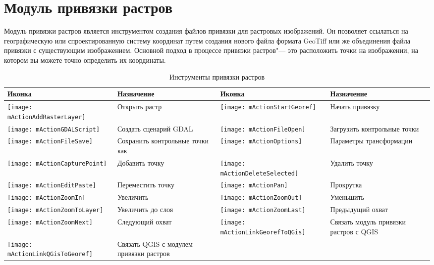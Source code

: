 
\section{Модуль привязки растров}


Модуль привязки растров является инструментом создания файлов привязки
для растровых изображений. Он позволяет ссылаться на географическую или
спроектированную систему координат путем создания нового файла формата
GeoTiff или же объединения файла привязки с существующим изображением.
Основной подход в процессе привязки растров"--- это расположить точки на
изображении, на котором вы можете точно определить их координаты.


\begin{table}[h]
\begin{tabular}{|m{1cm}|m{6cm}|m{1cm}|m{6cm}|}
 \hline \textbf{Иконка} & \textbf{Назначение} & \textbf{Иконка} &
 \textbf{Назначение} \\
 \hline \texttt{[image: mActionAddRasterLayer]} & Открыть растр &
 \texttt{[image: mActionStartGeoref]} & Начать привязку \\
 \hline \texttt{[image: mActionGDALScript]} & Создать сценарий GDAL &
 \texttt{[image: mActionFileOpen]} & Загрузить контрольные точки \\
 \hline \texttt{[image: mActionFileSave]} & Сохранить контрольные точки как &
 \texttt{[image: mActionOptions]} & Параметры трансформации \\
 \hline \texttt{[image: mActionCapturePoint]} & Добавить точку &
 \texttt{[image: mActionDeleteSelected]} & Удалить точку \\
 \hline \texttt{[image: mActionEditPaste]} & Переместить точку &
 \texttt{[image: mActionPan]} & Прокрутка \\
 \hline \texttt{[image: mActionZoomIn]} & Увеличить &
 \texttt{[image: mActionZoomOut]} & Уменьшить \\
 \hline \texttt{[image: mActionZoomToLayer]} & Увеличить до слоя &
 \texttt{[image: mActionZoomLast]} & Предыдущий охват \\
 \hline \texttt{[image: mActionZoomNext]} & Следующий охват &
 \texttt{[image: mActionLinkGeorefToQGis]} & Связать модуль привязки растров с QGIS \\
 \hline \texttt{[image: mActionLinkQGisToGeoref]} & Связать QGIS с модулем привязки растров &
 &  \\
\hline
\end{tabular}
\caption{Инструменты привязки растров}\label{tab:georeferencer_tools}
\end{table}

